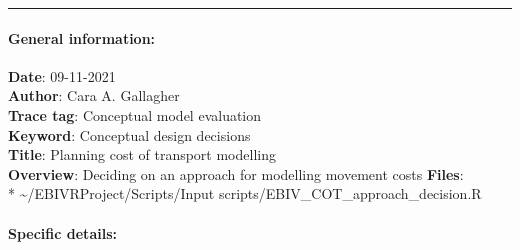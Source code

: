 \documentclass[
]{article}
\begin{document}
\begin{center}\rule{0.5\linewidth}{0.5pt}\end{center}

\hypertarget{general-information-2}{%
\paragraph{General information:}\label{general-information-2}}

\textbf{Date}: 09-11-2021\\
\textbf{Author}: Cara A. Gallagher\\
\textbf{Trace tag}: Conceptual model evaluation\\
\textbf{Keyword}: Conceptual design decisions\\
\textbf{Title}: Planning cost of transport modelling\\
\textbf{Overview}: Deciding on an approach for modelling movement costs
\textbf{Files}:\\
* \textasciitilde/EBIVRProject/Scripts/Input
scripts/EBIV\_COT\_approach\_decision.R

\hypertarget{specific-details-2}{%
\paragraph{Specific details:}\label{specific-details-2}}
\end{document}
